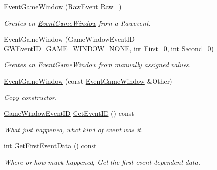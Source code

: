 \begin{DoxyCompactItemize}
\item 
\hyperlink{classphys_1_1EventGameWindow_aca917d4cf8ee17dd5253c294aac75bb8}{EventGameWindow} (\hyperlink{namespacephys_a8126d26e4507e66d09876988bb941fd4}{RawEvent} Raw\_\-)
\begin{DoxyCompactList}\small\item\em Creates an \hyperlink{classphys_1_1EventGameWindow}{EventGameWindow} from a Rawevent. \item\end{DoxyCompactList}\item 
\hyperlink{classphys_1_1EventGameWindow_aa9d3325376d97c6426c3f98e180352e9}{EventGameWindow} (\hyperlink{classphys_1_1EventGameWindow_a45225255070513d3cff88cdfea25cc09}{GameWindowEventID} GWEventID=GAME\_\-WINDOW\_\-NONE, int First=0, int Second=0)
\begin{DoxyCompactList}\small\item\em Creates an \hyperlink{classphys_1_1EventGameWindow}{EventGameWindow} from manually assigned values. \item\end{DoxyCompactList}\item 
\hyperlink{classphys_1_1EventGameWindow_a4011621e2c6fc55a9c89a489f90dc1c8}{EventGameWindow} (const \hyperlink{classphys_1_1EventGameWindow}{EventGameWindow} \&Other)
\begin{DoxyCompactList}\small\item\em Copy constructor. \item\end{DoxyCompactList}\item 
\hyperlink{classphys_1_1EventGameWindow_a45225255070513d3cff88cdfea25cc09}{GameWindowEventID} \hyperlink{classphys_1_1EventGameWindow_a9454b837e1f09e3927d3666dc8b5d88b}{GetEventID} () const 
\begin{DoxyCompactList}\small\item\em What just happened, what kind of event was it. \item\end{DoxyCompactList}\item 
int \hyperlink{classphys_1_1EventGameWindow_a28f0c0e000107bcce2b118c8d1657492}{GetFirstEventData} () const 
\begin{DoxyCompactList}\small\item\em Where or how much happened, Get the first event dependent data. \item\end{DoxyCompactList}\item 

\end{DoxyCompactItemize}
